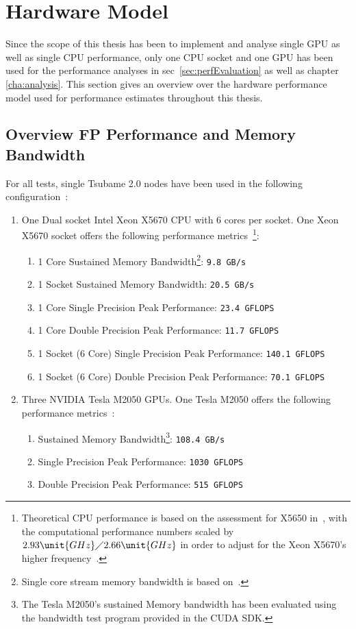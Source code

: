 \clearpage
\section{Hardware Model} \label{sec:testHardware}
Since the scope of this thesis has been to implement and analyse single GPU as well as single CPU performance, only one CPU socket and one GPU has been used for the performance analyses in sec~\ref{sec:perfEvaluation} as well as chapter \ref{cha:analysis}. This section gives an overview over the hardware performance model used for performance estimates throughout this thesis.

\subsection{Overview FP Performance and Memory Bandwidth} \label{sub:hardwarePerfOverview}

For all tests, single Tsubame 2.0 nodes have been used in the following configuration~\cite[p. 4]{TSUBAMEUserGuide}: 
\begin{enumerate}
 \item One Dual socket Intel Xeon X5670 CPU with 6 cores per socket. One Xeon X5670 socket offers the following performance metrics~\footnote{Theoretical CPU performance is based on the assessment for X5650 in~\cite[p. 4]{LatticeBoltzmannMulticoreCPU}, with the computational performance numbers scaled by $2.93 \unit{GHz}\diagup 2.66 \unit{GHz}$ in order to adjust for the Xeon X5670's higher frequency~\cite{XeonX5670Specs}.}:
  \begin{enumerate}
    \item 1 Core Sustained Memory Bandwidth\footnote{Single core stream memory bandwidth is based on~\cite[p. 7]{ArithmeticsOnWestmere}.}: \verb|9.8 GB/s|
    \item 1 Socket Sustained Memory Bandwidth: \verb|20.5 GB/s|
    \item 1 Core Single Precision Peak Performance: \verb|23.4 GFLOPS|
    \item 1 Core Double Precision Peak Performance: \verb|11.7 GFLOPS|
    \item 1 Socket (6 Core) Single Precision Peak Performance: \verb|140.1 GFLOPS|
    \item 1 Socket (6 Core) Double Precision Peak Performance: \verb|70.1 GFLOPS|
  \end{enumerate}
 \item Three NVIDIA Tesla M2050 GPUs. One Tesla M2050 offers the following performance metrics~\cite{TeslaC2050Specs}:
  \begin{enumerate}
    \item Sustained Memory Bandwidth\footnote{The Tesla M2050's sustained Memory bandwidth has been evaluated using the bandwidth test program provided in the CUDA SDK.}: \verb|108.4 GB/s|
    \item Single Precision Peak Performance: \verb|1030 GFLOPS|
    \item Double Precision Peak Performance: \verb|515 GFLOPS|
  \end{enumerate}
\end{enumerate}

